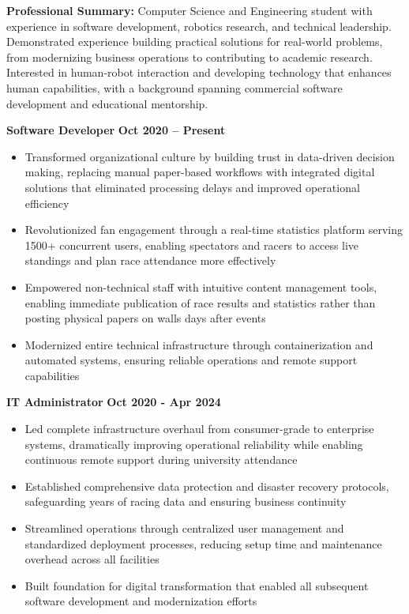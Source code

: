 \documentclass{article}
\begin{document}


\noindent
\begin{minipage}{\textwidth}
    \textbf{Professional Summary:} Computer Science and Engineering student with experience in software development, robotics research, and technical leadership.
        Demonstrated experience building practical solutions for real-world problems, from modernizing business operations to contributing to academic research.
        Interested in human-robot interaction and developing technology that enhances human capabilities, with a background spanning commercial software development and educational mentorship.
\end{minipage}




 \hfill {}

\textbf{Software Developer} \hfill \textbf{Oct 2020 – Present}
\begin{itemize}[noitemsep,topsep=2pt]
	\item Transformed organizational culture by building trust in data-driven decision making, replacing manual paper-based workflows with integrated digital solutions that eliminated processing delays and improved operational efficiency
	\item Revolutionized fan engagement through a real-time statistics platform serving 1500+ concurrent users, enabling spectators and racers to access live standings and plan race attendance more effectively
	\item Empowered non-technical staff with intuitive content management tools, enabling immediate publication of race results and statistics rather than posting physical papers on walls days after events
	\item Modernized entire technical infrastructure through containerization and automated systems, ensuring reliable operations and remote support capabilities
\end{itemize}

\textbf{IT Administrator} \hfill \textbf{Oct 2020 - Apr 2024}
\begin{itemize}[noitemsep,topsep=2pt]
	\item Led complete infrastructure overhaul from consumer-grade to enterprise systems, dramatically improving operational reliability while enabling continuous remote support during university attendance
	\item Established comprehensive data protection and disaster recovery protocols, safeguarding years of racing data and ensuring business continuity
	\item Streamlined operations through centralized user management and standardized deployment processes, reducing setup time and maintenance overhead across all facilities
	\item Built foundation for digital transformation that enabled all subsequent software development and modernization efforts
\end{itemize}
\end{document}
